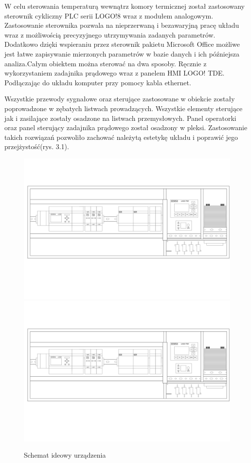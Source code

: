 \documentclass[oneside]{mgr}
\begin{document}
W celu sterowania temperaturą wewnątrz komory termicznej został zastosowany sterownik cykliczny PLC serii LOGO!8 wraz z modułem analogowym. Zastosowanie sterownika pozwala na nieprzerwaną i bezawaryjną pracę układu wraz z możliwością precyzyjnego utrzymywania zadanych parametrów. Dodatkowo dzięki wspieraniu przez sterownik pakietu Microsoft Office możliwe jest łatwe zapisywanie mierzonych parametrów w bazie danych i ich późniejsza analiza.Całym obiektem można sterować na dwa sposoby. Ręcznie z wykorzystaniem zadajnika prądowego wraz z panelem HMI LOGO! TDE. Podłączając do układu komputer przy pomocy kabla ethernet. 

Wszystkie przewody sygnałowe oraz sterujące zastosowane w obiekcie zostały poprowadzone w zębatych listwach prowadzących. Wszystkie elementy sterujące jak i zasilające zostały osadzone na listwach przemysłowych. Panel operatorki oraz panel sterujący zadajnika prądowego został osadzony w pleksi. Zastosowanie takich rozwiązań pozwoliło zachować należytą estetykę układu i poprawić jego przejżystość(rys. 3.1).

\begin{figure}
    \centering
    \includegraphics[width=\textwidth]{obiekt_front.jpg}
    \includegraphics[width=\textwidth]{obiekt_front.jpg}
    \caption{Schemat ideowy urządzenia}
\end{figure}
\end{document}
